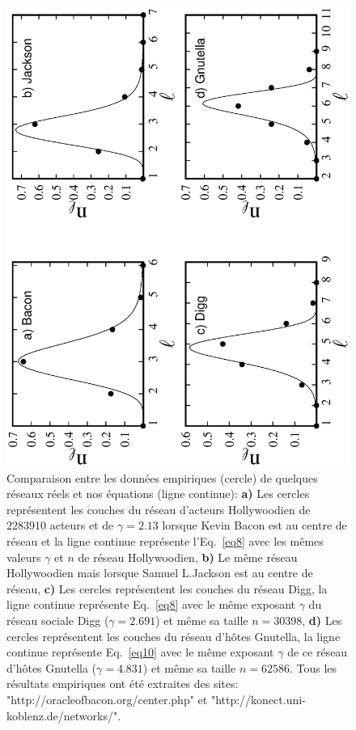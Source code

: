 \begin{figure}[h!]
	\centering
	\includegraphics[scale=0.6,angle=-90]{./figures/couch-reel}
	\caption{Comparaison entre les données empiriques (cercle) de quelques réseaux réels et nos équations (ligne continue): \textbf{a)} Les cercles représentent les couches du réseau d’acteurs Hollywoodien de $2283910$ acteurs et de $\gamma=2.13$ lorsque Kevin Bacon est au centre de réseau et la ligne continue représente l'Eq.~\eqref{eq8} avec les mêmes valeurs $\gamma$ et $n$ de réseau Hollywoodien, \textbf{b)} Le même réseau Hollywoodien mais lorsque Samuel L.Jackson est au centre de réseau, \textbf{c)} Les cercles représentent les couches du réseau Digg, la ligne continue représente Eq.~\eqref{eq8} avec le même exposant $\gamma$ du réseau sociale Digg ($\gamma=2.691$) et même sa taille $n=30398$, \textbf{d)} Les cercles représentent les couches du réseau d’h{\^o}tes Gnutella, la ligne continue représente Eq.~\eqref{eq10} avec le même exposant $\gamma$ de ce réseau d’hôtes Gnutella ($\gamma=4.831$) et même sa taille $n=62586$. Tous les résultats empiriques ont été extraites des sites: "http://oracleofbacon.org/center.php" et "http://konect.uni-koblenz.de/networks/".}	
	\label{couch-reel}
\end{figure}
    
